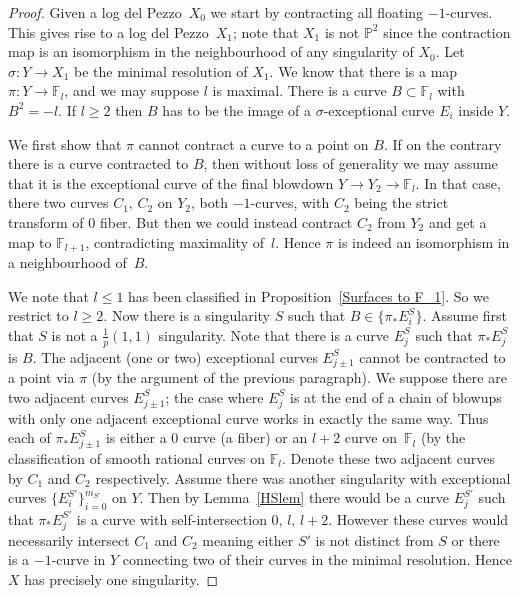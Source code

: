 \documentclass[12pt]{amsbook}
\theoremstyle{plain}
\newcommand{\ldp}{log del Pezzo}
\newcommand{\mb}[1]{\mathbb{#1}}
\newcommand{\F}{\mathbb{F}}
\renewcommand{\P}{\mathbb{P}}
\begin{document}
\begin{proof}
Given a \ldp\ $X_0$ we start by contracting all floating $-1$-curves. This gives rise to a \ldp\ $X_1$; note that $X_1$ is not $\P^2$ since the contraction map is an isomorphism in the neighbourhood of any singularity of $X_0$. Let $\sigma\colon Y\rightarrow X_1$ be the minimal resolution of $X_1$. We know that there is a map $\pi \colon Y \rightarrow \mathbb{F}_l$, and we may suppose $l$ is maximal.
There is a curve $B \subset \mathbb{F}_l$ with $B^2 = -l$. 
If $l\ge2$ then $B$ has to be the image of a $\sigma$-exceptional curve $E_i$ inside $Y$.

We first show that $\pi$ cannot contract a curve to a point on $B$.
If on the contrary there is a curve contracted to $B$, then
without loss of generality we may assume that it is the exceptional curve of the final blowdown $Y\rightarrow Y_2\rightarrow\F_l$. In that case, there two curves $C_1, \, C_2$ on $Y_2$, both $-1$-curves, with $C_2$ being the strict transform of $0$ fiber. But then we could instead contract $C_2$ from $Y_2$ and get a map to $\mb{F}_{l+1}$, contradicting maximality of~$l$. 
Hence $\pi$ is indeed an isomorphism in a neighbourhood of~$B$.


We note that  $l \leq 1$ has been classified in Proposition~\ref{Surfaces to F_1}. So we restrict to $l \geq 2$. Now there is a singularity $S$ such that $B \in \{ \pi_*E_i^S \}$. Assume first that $S$ is not a $\frac{1}{p}(1,1)$ singularity. Note that there is a curve $E_j^S$ such that $\pi_* E_j^S$ is $B$. The adjacent (one or two) exceptional curves $E_{j\pm1}^S$ cannot be contracted to a point via $\pi$ (by the argument of the previous paragraph). We suppose there are two adjacent curves $E_{j\pm 1}^S$; the case where $E_j^S$ is at the end of a chain of blowups with only one adjacent exceptional curve works in exactly the same way. Thus each of $\pi_*E_{j\pm 1}^S$ is either a $0$ curve (a fiber) or an $l+2$ curve on~$\F_l$ (by the classification of smooth rational curves on $\F_l$.
Denote these two adjacent curves by $C_1$ and $C_2$ respectively. Assume there was another singularity with exceptional curves $\{ E_i^{S'} \}_{i=0}^{m_{S'}} $ on $Y$. Then by Lemma~\ref{HSlem} there would be a curve $E_j^{S'}$ such that $\pi_* E_j^{S'}$ is a curve with self-intersection $0, \,  l,\,  l+2$. However these curves would necessarily intersect $C_1$ and $C_2$ meaning either $S'$ is not distinct from $S$ or there is a $-1$-curve in $Y$ connecting two of their curves in the minimal resolution. Hence $X$ has precisely one singularity. 


\end{proof}
\end{document}
